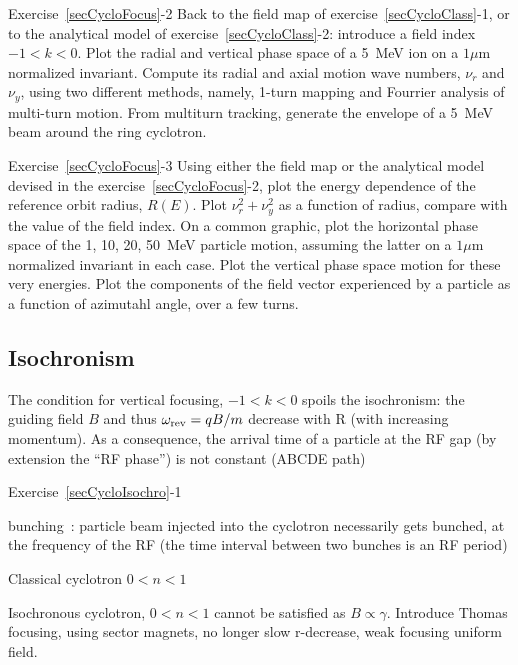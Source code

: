 \smallskip
\noindent {\small $\bullet$} Exercise~\ref{secCycloFocus}-2
Back to the field map of exercise~\ref{secCycloClass}-1, or to the analytical model 
of exercise~\ref{secCycloClass}-2: introduce a field index $-1<k<0$. 
Plot the radial and vertical phase space of a 5~MeV ion on a $1\mu$m normalized invariant.  
Compute its radial and axial motion wave numbers, $\nu_r$ and $\nu_y$, 
using two different methods, namely, 1-turn mapping and  Fourrier analysis of multi-turn motion. 
From multiturn tracking, generate the envelope of a 5~MeV beam around the ring cyclotron.  


\smallskip
\noindent {\small $\bullet$} Exercise~\ref{secCycloFocus}-3
Using either the field map or the analytical model devised in the  exercise~\ref{secCycloFocus}-2, 
 plot the energy dependence of the reference orbit radius, $R(E)$. 
Plot  $\nu_r^2 + \nu_y^2$ as a function of radius, compare with the value of the field index. 
On a common graphic, plot the horizontal phase space of the 1, 10, 20, 50~MeV particle motion,
assuming the latter on a $1\mu$m normalized invariant in each case.
Plot the vertical phase space motion for these very energies. 
Plot the components of the field vector experienced by a particle as a function of 
azimutahl angle, over a few turns.


\subsection{Isochronism  \label{secCycloIsochro}}
  

The  condition  for vertical focusing, $-1 < k <0$ 
spoils the isochronism: the guiding field $B$ and thus $\omega_{\rm rev} = qB/m$ decrease with R (with increasing momentum). 
 As a consequence, the arrival time of a particle at the RF gap (by 
extension the ``RF phase'') is not constant  (ABCDE path)


\smallskip
\noindent {\small $\bullet$} Exercise~\ref{secCycloIsochro}-1


     bunching~: particle beam injected into the cyclotron necessarily gets bunched, at the 
frequency of the RF (the time interval between two bunches is an RF period)




Classical cyclotron $0<n<1$


Isochronous cyclotron, $0<n<1$ cannot be satisfied as $B\propto \gamma$. Introduce Thomas focusing, using sector magnets,
no longer slow r-decrease, weak focusing uniform field.



